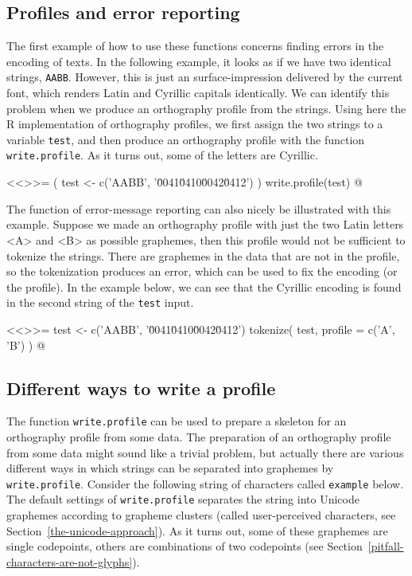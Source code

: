 


\subsection*{Profiles and error reporting}
\label{error-reporting}

The first example of how to use these functions concerns finding errors in the
encoding of texts. In the following example, it looks as if we have two
identical strings, \texttt{AABB}. However, this is just an surface-impression
delivered by the current font, which renders Latin and Cyrillic capitals
identically. We can identify this problem when we produce an orthography profile
from the strings. Using here the R implementation of orthography profiles, we
first assign the two strings to a variable \texttt{test}, and then produce an
orthography profile with the function \texttt{write.profile}. As it turns out,
some of the letters are Cyrillic.

<<>>=
( test <- c('AABB', '\u0041\u0410\u0042\u0412') )
write.profile(test)
@

The function of error-message reporting can also nicely be illustrated
with this example. Suppose we made an orthography profile with just the two
Latin letters <A> and <B> as possible graphemes, then this profile would not be
sufficient to tokenize the strings. There are graphemes in the data that are not
in the profile, so the tokenization produces an error, which can be used to fix
the encoding (or the profile). In the example below, we can see that the
Cyrillic encoding is found in the second string of the \texttt{test} input.

<<>>=
test <- c('AABB', '\u0041\u0410\u0042\u0412')
tokenize( test, profile = c('A', 'B') )
@

\subsection*{Different ways to write a profile}
\label{write-profile}

The function \texttt{write.profile} can be used to prepare a skeleton for an
orthography profile from some data. The preparation of an orthography profile
from some data might sound like a trivial problem, but actually there are
various different ways in which strings can be separated into graphemes by
\texttt{write.profile}. Consider the following string of characters called
\texttt{example} below. The default settings of \texttt{write.profile} separates
the string into Unicode graphemes according to grapheme clusters
(called user-perceived characters, see Section~\ref{the-unicode-approach}). As it 
turns out, some of these graphemes are single codepoints, others are combinations
of two codepoints (see Section~\ref{pitfall-characters-are-not-glyphs}).


